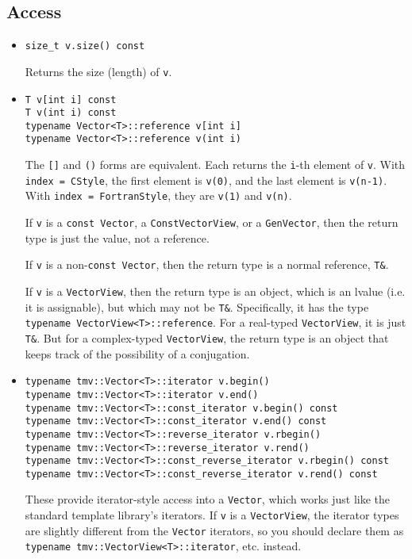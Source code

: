 \documentclass[twoside,letterpaper,11pt]{article}
\renewcommand{\tt}[1]{{\texttt {#1}}}
\begin{document}
\subsection{Access}

\begin{itemize}
\item
\begin{verbatim}
size_t v.size() const
\end{verbatim}
Returns the size (length) of \tt{v}.

\item
\begin{verbatim}
T v[int i] const
T v(int i) const
typename Vector<T>::reference v[int i]
typename Vector<T>::reference v(int i)
\end{verbatim}
The \tt{[]} and \tt{()} forms are equivalent.  Each returns the \tt{i}-th element of \tt{v}.  
With \tt{index = CStyle}, the first 
element is \tt{v(0)}, and the last element is \tt{v(n-1)}.
With \tt{index = FortranStyle}, they are \tt{v(1)} and \tt{v(n)}.

If \tt{v} is a 
\tt{const Vector}, a \tt{ConstVectorView}, or a \tt{GenVector}, 
then the return type is just the value, not a reference.

If \tt{v} is a 
non-\tt{const Vector}, then the return type is a normal reference, \tt{T\&}.

If \tt{v} is a \tt{VectorView}, then the return type is an object, which is
an lvalue (i.e. it is assignable), but which may not be \tt{T\&}.
Specifically, it has the type \tt{typename VectorView<T>::reference}.
For a real-typed \tt{VectorView}, it is just \tt{T\&}.  But for a
complex-typed \tt{VectorView}, the return type is an object that keeps track of the
possibility of a conjugation.

\item
\begin{verbatim}
typename tmv::Vector<T>::iterator v.begin()
typename tmv::Vector<T>::iterator v.end()
typename tmv::Vector<T>::const_iterator v.begin() const
typename tmv::Vector<T>::const_iterator v.end() const
typename tmv::Vector<T>::reverse_iterator v.rbegin()
typename tmv::Vector<T>::reverse_iterator v.rend()
typename tmv::Vector<T>::const_reverse_iterator v.rbegin() const
typename tmv::Vector<T>::const_reverse_iterator v.rend() const
\end{verbatim}
These provide iterator-style access into a \tt{Vector}, which works just like
the standard template library's iterators.  If \tt{v} is a \tt{VectorView},
the iterator types are slightly different from the \tt{Vector} iterators, 
so you should declare them as \tt{typename tmv::VectorView<T>::iterator},
etc. instead.

\end{itemize}
\end{document}
